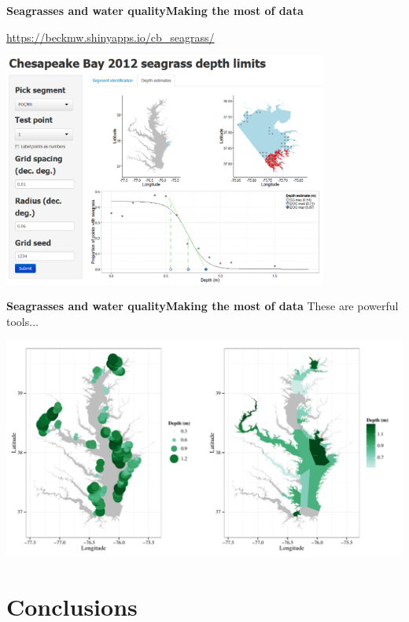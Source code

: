 \documentclass[serif]{beamer}\usepackage[]{graphicx}\usepackage[]{color}
\begin{document}
\begin{frame}{\textbf{Seagrasses and water quality}}{\textbf{Making the most of data}}
\centerline{\href{https://beckmw.shinyapps.io/cb_seagrass/}{https://beckmw.shinyapps.io/cb\_seagrass/}}
\centerline{\includegraphics[width = 0.8\textwidth]{fig/widget_cb.png}}
\end{frame}

\begin{frame}{\textbf{Seagrasses and water quality}}{\textbf{Making the most of data}}
These are powerful tools...


{\centering \includegraphics[width=\textwidth]{fig/cb_all} 

}



\end{frame}

\section{Conclusions}
\end{document}
